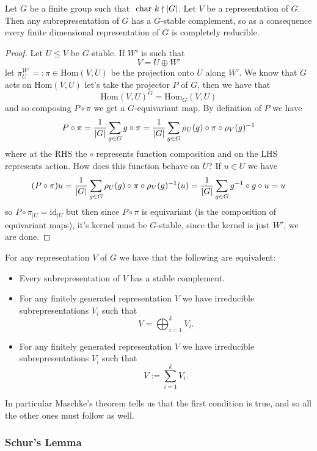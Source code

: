 \documentclass[11pt]{scrartcl}
\begin{document}
	\begin{theorem}[Maschke]
		Let $G$ be a finite group such that $\text{ char } k\nmid \left\lvert G \right\rvert$. Let $V$ be a representation of $G$. Then any subrepresentation of $G$ has a $G$-stable complement, so as a consequence every finite dimensional representation of $G$ is completely reducible.
	\end{theorem}
	\begin{proof}
		Let $U\le V$ be $G$-stable. If $W'$ is such that
		$$V=U\oplus W'$$
		let $\pi^{W'}_U=:\pi\in \text{Hom}(V,U)$ be the projection onto $U$ along $W'$. We know that $G$ acts on $\text{Hom}(V,U)$ let's take the projector $P$ of $G$, then we have that
		$$\text{Hom}(V,U)^G=\text{Hom}_G(V,U)$$
		and so composing $P\circ \pi$ we get a $G$-equivariant map. By definition of $P$ we have
		$$P\circ \pi = \frac{1}{\left\lvert G \right\rvert}\sum_{g\in G} g\circ \pi=\frac{1}{\left\lvert G \right\rvert}\sum_{g\in G}\rho_U(g)\circ \pi\circ \rho_V(g)^{-1}$$
		where at the RHS the $\circ$ represents function composition and on the LHS represents action. How does this function behave on $U$? If $u\in U$ we have
		$$(P\circ \pi) u=\frac{1}{\left\lvert G \right\rvert}\sum_{g\in G}\rho_U(g)\circ \pi\circ \rho_V(g)^{-1}(u)=\frac{1}{\left\lvert G \right\rvert}\sum_{g\in G}g^{-1}\circ g\circ u=u$$
		so $P\circ \pi_{\mid U}=\text{id}_{\mid U}$ but then since $P\circ \pi$ is equivariant (is the composition of equivariant maps), it's kernel must be $G$-stable, since the kernel is just $W'$, we are done.
	\end{proof}
	\begin{corollary}
		For any representation $V$ of $G$ we have that the following are equivalent:
		\begin{itemize}
			\item Every subrepresentation of $V$ has a stable complement.
			\item For any finitely generated representation $V$ we have irreducible subrepresentations $V_i$ such that
			$$V=\bigoplus_{i=1}^k V_i.$$
			\item For any finitely generated representation $V$ we have irreducible subrepresentations $V_i$ such that
			$$V:=\sum_{i=1}^k V_i.$$
		\end{itemize}
		In particular Maschke's theorem tells us that the first condition is true, and so all the other ones must follow as well.
	\end{corollary}
	
	\subsubsection{Schur's Lemma}
	
\end{document}
